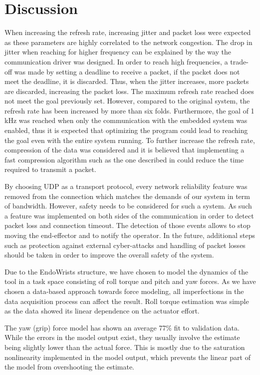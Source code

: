\section{Discussion}

When increasing the refresh rate, increasing jitter and packet loss were expected as these parameters are highly correlated to the network congestion\cite{cisco_jitter}. The drop in jitter when reaching for higher frequency can be explained by the way the communication driver was designed. In order to reach high frequencies, a trade-off was made by setting a deadline to receive a packet, if the packet does not meet the deadline, it is discarded. Thus, when the jitter increases, more packets are discarded, increasing the packet loss.
The maximum refresh rate reached does not meet the goal previously set. However, compared to the original system, the refresh rate has been increased by more than six folds. Furthermore, the goal of 1 kHz was reached when only the communication with the embedded system was enabled, thus it is expected that optimizing the program could lead to reaching the goal even with the entire system running.
To further increase the refresh rate, compression of the data was considered and it is believed that implementing a fast compression algorithm such as the one described in \cite{fast_ZIV} could reduce the time required to transmit a packet.

By choosing UDP as a transport protocol, every network reliability feature was removed from the connection which matches the demands of our system in term of bandwidth. 
However, safety needs to be considered for such a system. 
As such a feature was implemented on both sides of the communication in order to detect packet loss and connection timeout. 
The detection of those events allows to stop moving the end-effector and to notify the operator. 
In the future, additional steps such as protection against external cyber-attacks and handling of packet losses should be taken in order to improve the overall safety of the system.


Due to the EndoWrists structure, we have chosen to model the dynamics of the tool in a task space consisting of roll torque and pitch and yaw forces.
As we have chosen a data-based approach towards force modeling, all imperfections in the data acquisition process can affect the result.
Roll torque estimation was simple as the data showed its linear dependence on the actuator effort.

The yaw (grip) force model has shown an average 77\% fit to validation data.
While the errors in the model output exist, they usually involve the estimate being slightly lower than the actual force.
This is mostly due to the saturation nonlinearity implemented in the model output, which prevents the linear part of the model from overshooting the estimate.

